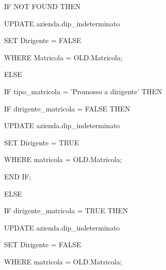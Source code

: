 \begin{flushleft}
\begin{description}
\begin{description}
                        \vspace{0.5cm}

                        \item IF NOT FOUND THEN 
                            \begin{description}
                                \item UPDATE azienda.dip\_indeterminato
                                \item SET Dirigente = FALSE
                                \item WHERE Matricola = OLD.Matricola;
                            \end{description}
                        \item ELSE
                        \begin{description}
                            \item IF tipo\_matricola = 'Promosso a dirigente' THEN
                            \begin{description}
                                \item IF dirigente\_matricola = FALSE THEN
                                \begin{description}
                                    \item UPDATE azienda.dip\_indeterminato
                                    \item SET Dirigente = TRUE
                                    \item WHERE matricola = OLD.Matricola;
                                \end{description}
                                \item END IF;
                            \end{description}
                            \item ELSE 
                            \begin{description}
                                \item IF dirigente\_matricola = TRUE THEN
                                \begin{description}
                                    \item UPDATE azienda.dip\_indeterminato
                                    \item SET Dirigente = FALSE
                                    \item WHERE matricola = OLD.Matricola;
                                \end{description}

\end{description}
\end{description}
\end{description}
\end{description}
\end{flushleft}
